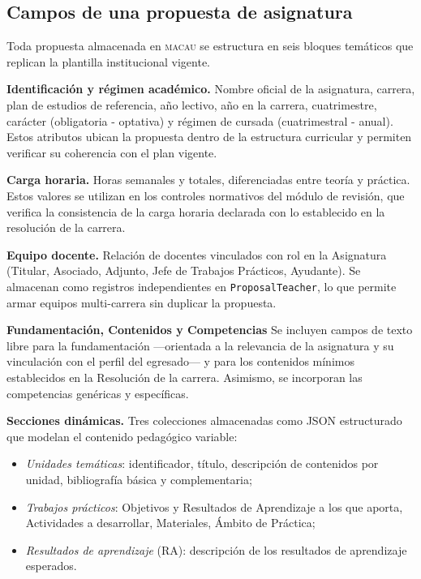 \subsection{Campos de una propuesta de asignatura}
\label{subsec:campos_propuesta}

Toda propuesta almacenada en \textsc{macau} se estructura en seis bloques
temáticos que replican la plantilla institucional vigente.

\textbf{Identificación y régimen académico.} Nombre oficial de la asignatura,
carrera, plan de estudios de referencia, año
lectivo, año en la carrera, cuatrimestre, carácter (obligatoria - optativa) y
régimen de cursada (cuatrimestral - anual). Estos atributos ubican la propuesta
dentro de la estructura curricular y permiten verificar su coherencia con el
plan vigente.

\textbf{Carga horaria.} Horas semanales y totales, diferenciadas entre teoría y práctica. Estos valores se utilizan en los controles normativos del módulo de revisión, que verifica la consistencia de la carga horaria declarada con lo establecido en la resolución de la carrera.

\textbf{Equipo docente.} Relación de docentes vinculados con rol en la Asignatura
(Titular, Asociado, Adjunto, Jefe de Trabajos Prácticos, Ayudante). Se almacenan como registros independientes en
\texttt{ProposalTeacher}, lo que permite armar equipos multi-carrera sin
duplicar la propuesta.

\textbf{Fundamentación, Contenidos y Competencias} Se incluyen campos de texto libre para la fundamentación —orientada a la relevancia de la asignatura y su vinculación con el perfil del egresado— y para los contenidos mínimos establecidos en la Resolución de la carrera. Asimismo, se incorporan las competencias genéricas y específicas.

\textbf{Secciones dinámicas.} Tres colecciones almacenadas como JSON
estructurado que modelan el contenido pedagógico variable:
\begin{itemize}[noitemsep, topsep=2pt]
    \item \textit{Unidades temáticas}: identificador, título, descripción de contenidos por unidad, bibliografía básica y complementaria;
    \item \textit{Trabajos prácticos}: Objetivos y Resultados de Aprendizaje a los que aporta, Actividades a desarrollar, Materiales, Ámbito de Práctica;
    \item \textit{Resultados de aprendizaje} (RA): descripción de los resultados de aprendizaje esperados.
\end{itemize}

